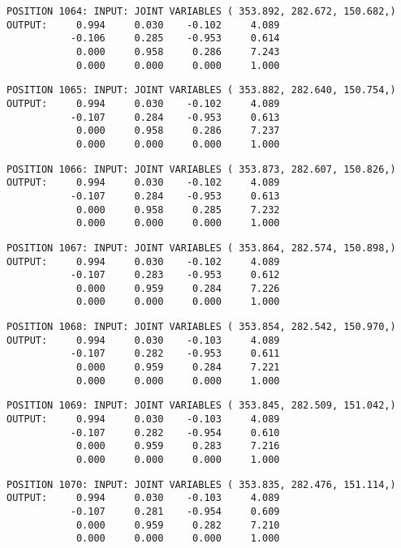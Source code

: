 \begin{verbatim}
POSITION 1064: INPUT: JOINT VARIABLES ( 353.892, 282.672, 150.682,)
OUTPUT:     0.994     0.030    -0.102     4.089
           -0.106     0.285    -0.953     0.614
            0.000     0.958     0.286     7.243
            0.000     0.000     0.000     1.000
\end{verbatim} \pagebreak[1]\begin{verbatim}
POSITION 1065: INPUT: JOINT VARIABLES ( 353.882, 282.640, 150.754,)
OUTPUT:     0.994     0.030    -0.102     4.089
           -0.107     0.284    -0.953     0.613
            0.000     0.958     0.286     7.237
            0.000     0.000     0.000     1.000
\end{verbatim} \pagebreak[1]\begin{verbatim}
POSITION 1066: INPUT: JOINT VARIABLES ( 353.873, 282.607, 150.826,)
OUTPUT:     0.994     0.030    -0.102     4.089
           -0.107     0.284    -0.953     0.613
            0.000     0.958     0.285     7.232
            0.000     0.000     0.000     1.000
\end{verbatim} \pagebreak[1]\begin{verbatim}
POSITION 1067: INPUT: JOINT VARIABLES ( 353.864, 282.574, 150.898,)
OUTPUT:     0.994     0.030    -0.102     4.089
           -0.107     0.283    -0.953     0.612
            0.000     0.959     0.284     7.226
            0.000     0.000     0.000     1.000
\end{verbatim} \pagebreak[1]\begin{verbatim}
POSITION 1068: INPUT: JOINT VARIABLES ( 353.854, 282.542, 150.970,)
OUTPUT:     0.994     0.030    -0.103     4.089
           -0.107     0.282    -0.953     0.611
            0.000     0.959     0.284     7.221
            0.000     0.000     0.000     1.000
\end{verbatim} \pagebreak[1]\begin{verbatim}
POSITION 1069: INPUT: JOINT VARIABLES ( 353.845, 282.509, 151.042,)
OUTPUT:     0.994     0.030    -0.103     4.089
           -0.107     0.282    -0.954     0.610
            0.000     0.959     0.283     7.216
            0.000     0.000     0.000     1.000
\end{verbatim} \pagebreak[1]\begin{verbatim}
POSITION 1070: INPUT: JOINT VARIABLES ( 353.835, 282.476, 151.114,)
OUTPUT:     0.994     0.030    -0.103     4.089
           -0.107     0.281    -0.954     0.609
            0.000     0.959     0.282     7.210
            0.000     0.000     0.000     1.000
\end{verbatim} \pagebreak[1]\begin{verbatim}

\end{verbatim}
